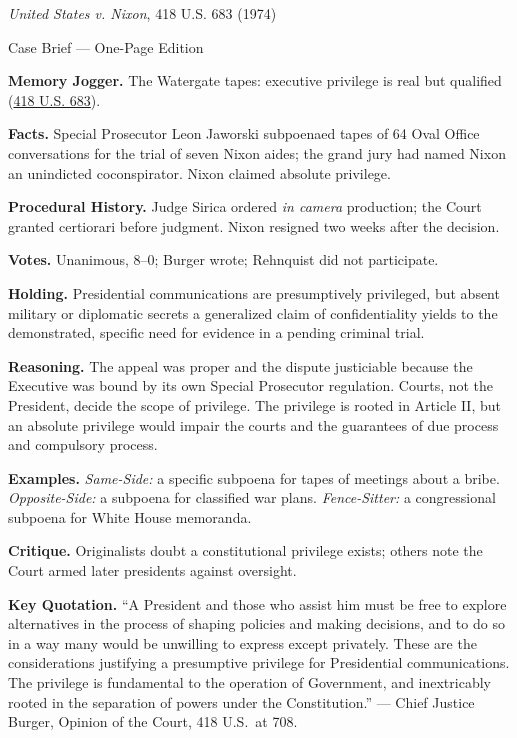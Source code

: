 \documentclass[12pt]{article}
\begin{document}
\begin{center}
{\Large \textit{United States v. Nixon}, 418 U.S. 683 (1974)\par}
\vspace{0.3em}
{\normalsize Case Brief --- One-Page Edition\par}
\end{center}

\textbf{Memory Jogger.} The Watergate tapes: executive privilege is real but qualified (\href{https://supreme.justia.com/cases/federal/us/418/683/}{418 U.S. 683}).

\textbf{Facts.} Special Prosecutor Leon Jaworski subpoenaed tapes of 64 Oval Office conversations for the trial of seven Nixon aides; the grand jury had named Nixon an unindicted coconspirator. Nixon claimed absolute privilege.

\textbf{Procedural History.} Judge Sirica ordered \textit{in camera} production; the Court granted certiorari before judgment. Nixon resigned two weeks after the decision.

\textbf{Votes.} Unanimous, 8--0; Burger wrote; Rehnquist did not participate.

\textbf{Holding.} Presidential communications are presumptively privileged, but absent military or diplomatic secrets a generalized claim of confidentiality yields to the demonstrated, specific need for evidence in a pending criminal trial.

\textbf{Reasoning.} The appeal was proper and the dispute justiciable because the Executive was bound by its own Special Prosecutor regulation. Courts, not the President, decide the scope of privilege. The privilege is rooted in Article II, but an absolute privilege would impair the courts and the guarantees of due process and compulsory process.

\textbf{Examples.} \emph{Same-Side:} a specific subpoena for tapes of meetings about a bribe. \emph{Opposite-Side:} a subpoena for classified war plans. \emph{Fence-Sitter:} a congressional subpoena for White House memoranda.

\textbf{Critique.} Originalists doubt a constitutional privilege exists; others note the Court armed later presidents against oversight.

\textbf{Key Quotation.} ``A President and those who assist him must be free to explore alternatives in the process of shaping policies and making decisions, and to do so in a way many would be unwilling to express except privately. These are the considerations justifying a presumptive privilege for Presidential communications. The privilege is fundamental to the operation of Government, and inextricably rooted in the separation of powers under the Constitution.'' --- Chief Justice Burger, Opinion of the Court, 418 U.S.\ at 708.
\end{document}

